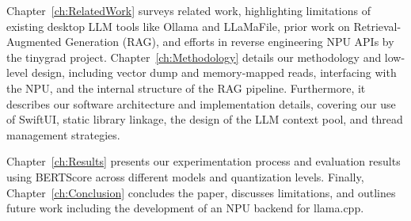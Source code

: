 Chapter~\ref{ch:RelatedWork} surveys related work, highlighting limitations of existing desktop LLM tools like Ollama and LLaMaFile, prior work on Retrieval-Augmented Generation (RAG), and efforts in reverse engineering NPU APIs by the tinygrad project. Chapter~\ref{ch:Methodology} details our methodology and low-level design, including vector dump and memory-mapped reads, interfacing with the NPU, and the internal structure of the RAG pipeline. Furthermore, it describes our software architecture and implementation details, covering our use of SwiftUI, static library linkage, the design of the LLM context pool, and thread management strategies. 

Chapter~\ref{ch:Results} presents our experimentation process and evaluation results using BERTScore across different models and quantization levels. Finally, Chapter~\ref{ch:Conclusion} concludes the paper, discusses limitations, and outlines future work including the development of an NPU backend for llama.cpp.